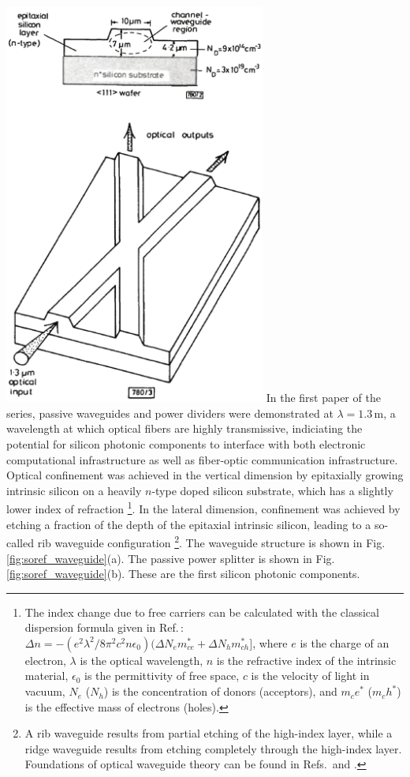 \includegraphics[width=8.6cm]{figures/_soref_1985.pdf}
In the first paper of the series, passive waveguides and power dividers were demonstrated at $\lambda = 1.3$\,\textmu m, a wavelength at which optical fibers are highly transmissive, indiciating the potential for silicon photonic components to interface with both electronic computational infrastructure as well as fiber-optic communication infrastructure. Optical confinement was achieved in the vertical dimension by epitaxially growing intrinsic silicon on a heavily $n$-type doped silicon substrate, which has a slightly lower index of refraction \footnote{The index change due to free carriers can be calculated with the classical dispersion formula given in Ref.\,\cite{sole1985}: $\Delta n = -(e^2\lambda^2/8\pi^2 c^2n\epsilon_0)(\Delta N_em_{ce}^*+\Delta N_hm_{ch}^*]$, where $e$ is the charge of an electron, $\lambda$ is the optical wavelength, $n$ is the refractive index of the intrinsic material, $\epsilon_0$ is the permittivity of free space, $c$ is the velocity of light in vacuum, $N_e$ ($N_h$) is the concentration of donors (acceptors), and $m_ce^*$ ($m_ch^*$) is the effective mass of electrons (holes).}. In the lateral dimension, confinement was achieved by etching a fraction of the depth of the epitaxial intrinsic silicon, leading to a so-called rib waveguide configuration \footnote{A rib waveguide results from partial etching of the high-index layer, while a ridge waveguide results from etching completely through the high-index layer. Foundations of optical waveguide theory can be found in Refs.\,\cite{snlo1983} and \cite{hu2009}.}. The waveguide structure is shown in Fig.\,\ref{fig:soref_waveguide}(a). The passive power splitter is shown in Fig.\,\ref{fig:soref_waveguide}(b). These are the first silicon photonic components.

